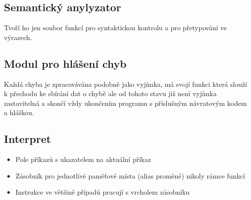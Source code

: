 \documentclass[a4paper]{article}
\begin{document}
\subsection{Semantický anylyzator}
Tvoří ho jen soubor funkcí pro syntaktickou kontrolu a pro přetypování ve výrazech.


\subsection{Modul pro hlášení chyb}
Každá chyba je zpracovávána podobně jako vyjímka, má svojí funkci která slouží k přechodu ke sbírání dat o chybě ale od tohoto stavu již není vyjímka zastavitelná a skončí vždy ukončením programu s příslušným návratovým kodem a hláškou.

\subsection{Interpret}
\begin{itemize}
	\item Pole příkazů s ukazatelem na aktuální příkaz
	\item Zásobník pro jednotlivé paměťové místa (alias proměné) nikoly rámce funkcí
	\item Instrukce ve většině případů pracují s vrcholem zásobníku 
\end{itemize}
\end{document}
